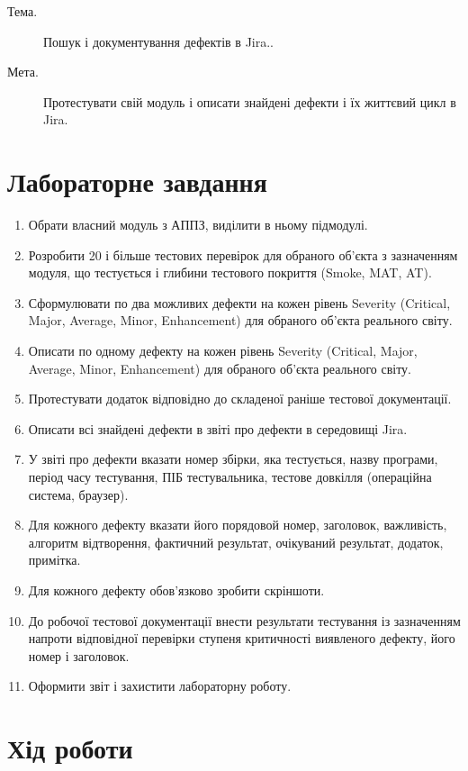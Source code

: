 \documentclass[oneside,14pt]{extarticle}
\newcommand\theme{Пошук і документування дефектів в Jira.}
\newcommand\purpose{Протестувати свій модуль і описати знайдені дефекти і їх
	життєвий цикл в Jira}
\begin{document}
\begin{normalsize}
	\begin{description}
		\item[Тема.] \theme.
		\item[Мета.] \purpose.
	\end{description}

    \section*{Лабораторне завдання}
    \begin{enumerate}
    	\item Обрати власний модуль з АППЗ, виділити в ньому підмодулі.
    	\item Розробити 20 і більше тестових перевірок для обраного об'єкта з
    	зазначенням модуля, що тестується і глибини тестового покриття (Smoke,
    	MAT, AT).
    	\item Сформулювати по два можливих дефекти на кожен рівень Severity
    	(Critical, Major, Average, Minor, Enhancement) для обраного об'єкта реального
    	світу.
    	\item Описати по одному дефекту на кожен рівень Severity (Critical, Major,
    	Average, Minor, Enhancement) для обраного об'єкта реального світу.
    	\item Протестувати додаток відповідно до складеної раніше тестової
    	документації.
    	\item Описати всі знайдені дефекти в звіті про дефекти в середовищі Jira.
    	\item У звіті про дефекти вказати номер збірки, яка тестується, назву
    	програми, період часу тестування, ПІБ тестувальника, тестове довкілля
    	(операційна система, браузер).
    	\item Для кожного дефекту вказати його порядовой номер, заголовок,
    	важливість, алгоритм відтворення, фактичний результат, очікуваний
    	результат, додаток, примітка.
    	\item Для кожного дефекту обов'язково зробити скріншоти.
    	\item До робочої тестової документації внести результати тестування із
    	зазначенням напроти відповідної перевірки ступеня критичності виявленого
    	дефекту, його номер і заголовок.
    	\item Оформити звіт і захистити лабораторну роботу.
    \end{enumerate}
	\section*{Хід роботи}
	

\end{normalsize}
\end{document}
